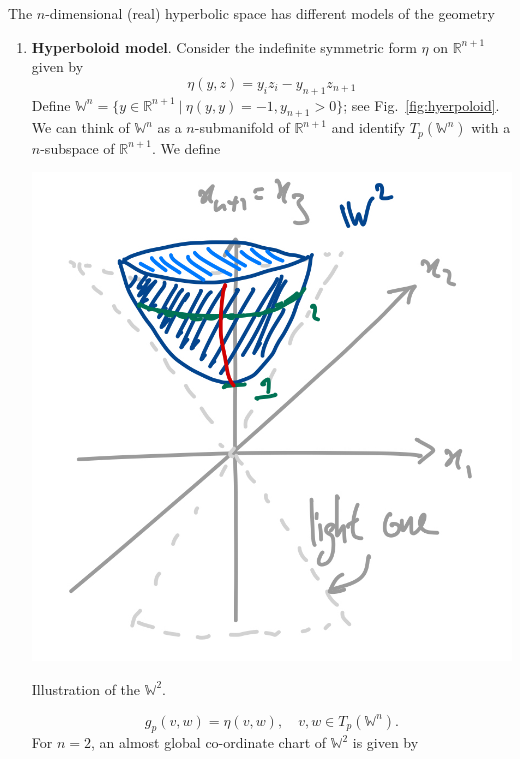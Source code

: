 \documentclass[letter-paper]{tufte-book}
\newenvironment{example}[1][Example]{\begin{trivlist}
\item[\hskip \labelsep {\bfseries #1}]}{\end{trivlist}}
\begin{document}
\begin{example}
  The $n$-dimensional (real) hyperbolic space has different models of the geometry
  \begin{enumerate}
    \item \textbf{Hyperboloid model}. Consider the indefinite symmetric form $\eta$ on $\mathbb{R}^{n+1}$ given by
    \begin{equation*}
      \eta(y, z) = y_i z_i - y_{n+1}z_{n+1}
    \end{equation*}
    Define $\mathbb{W}^n = \{y\in \mathbb{R}^{n+1}\ |\ \eta(y, y)=-1, y_{n+1} > 0 \}$; see Fig.~\ref{fig:hyerpoloid}. We can think of $\mathbb{W}^n$ as a $n$-submanifold of $\mathbb{R}^{n+1}$ and identify $T_p(\mathbb{W}^n)$ with a $n$-subspace of $\mathbb{R}^{n+1}$. We define
    \begin{marginfigure}
      \includegraphics{hyperboloid}
      \caption{Illustration of the $\mathbb{W}^2$.}
      \label{fig:hyperboloid}
    \end{marginfigure}
    \begin{equation*}
      g_p(v, w) = \eta(v, w), \quad v,w \in T_p(\mathbb{W}^n).
    \end{equation*}
    For $n=2$, an almost global co-ordinate chart of $\mathbb{W}^2$ is given by

\end{enumerate}
\end{example}
\end{document}
